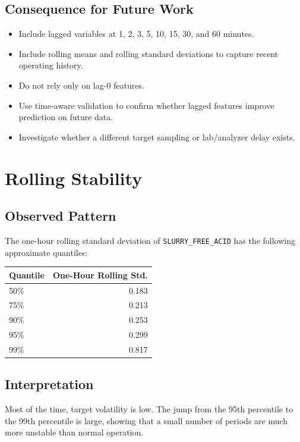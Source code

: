 \documentclass[11pt,a4paper]{article}
\begin{document}
\subsection{Consequence for Future Work}

\begin{itemize}
    \item Include lagged variables at 1, 2, 3, 5, 10, 15, 30, and 60 minutes.
    \item Include rolling means and rolling standard deviations to capture recent operating history.
    \item Do not rely only on lag-0 features.
    \item Use time-aware validation to confirm whether lagged features improve prediction on future data.
    \item Investigate whether a different target sampling or lab/analyzer delay exists.
\end{itemize}

\section{Rolling Stability}

\subsection{Observed Pattern}

The one-hour rolling standard deviation of \texttt{SLURRY\_FREE\_ACID} has the following approximate quantiles:

\begin{longtable}{lr}
\toprule
Quantile & One-Hour Rolling Std. \\
\midrule
50\% & 0.183 \\
75\% & 0.213 \\
90\% & 0.253 \\
95\% & 0.299 \\
99\% & 0.817 \\
\bottomrule
\end{longtable}

\subsection{Interpretation}

Most of the time, target volatility is low. The jump from the 95th percentile to the 99th percentile is large, showing that a small number of periods are much more unstable than normal operation.
\end{document}
